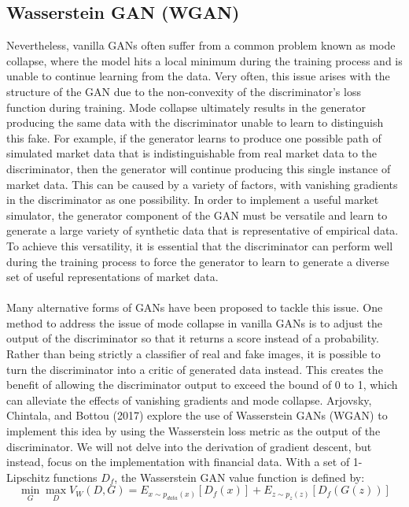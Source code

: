 \subsection{Wasserstein GAN (WGAN)}
Nevertheless, vanilla GANs often suffer from a common problem known as mode collapse, where the model hits a local minimum during the training process and is unable to continue learning from the data. Very often, this issue arises with the structure of the GAN due to the non-convexity of the discriminator's loss function during training. Mode collapse ultimately results in the generator producing the same data with the discriminator unable to learn to distinguish this fake. For example, if the generator learns to produce one possible path of simulated market data that is indistinguishable from real market data to the discriminator, then the generator will continue producing this single instance of market data. This can be caused by a variety of factors, with vanishing gradients in the discriminator as one possibility. In order to implement a useful market simulator, the generator component of the GAN must be versatile and learn to generate a large variety of synthetic data that is representative of empirical data. To achieve this versatility, it is essential that the discriminator can perform well during the training process to force the generator to learn to generate a diverse set of useful representations of market data.
\\
\\
Many alternative forms of GANs have been proposed to tackle this issue. One method to address the issue of mode collapse in vanilla GANs is to adjust the output of the discriminator so that it returns a score instead of a probability. Rather than being strictly a classifier of real and fake images, it is possible to turn the discriminator into a critic of generated data instead. This creates the benefit of allowing the discriminator output to exceed the bound of 0 to 1, which can alleviate the effects of vanishing gradients and mode collapse. Arjovsky, Chintala, and Bottou (2017) explore the use of Wasserstein GANs (WGAN) \cite{wgan} to implement this idea by using the Wasserstein loss metric as the output of the discriminator. We will not delve into the derivation of gradient descent, but instead, focus on the implementation with financial data. With a set of 1-Lipschitz functions $D_f$, the Wasserstein GAN value function is defined by:
\begin{equation}
    \min_{G}\max_{D}V_W(D,G) = E_{x\sim p_{data}(x)}[D_f(x)]+E_{z\sim p_{z}(z)}[D_f(G(z))]
\end{equation}
